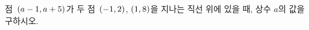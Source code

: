 점~$(a-1{,}\mkern3mu\mathopen{}a+5)$가 두 점~$(-1{,}\mkern3mu\mathopen{}2)$, $(1{,}\mkern3mu\mathopen{}8)$을 지나는 직선 위에 있을 때, 상수 $a$의 값을 구하시오.
